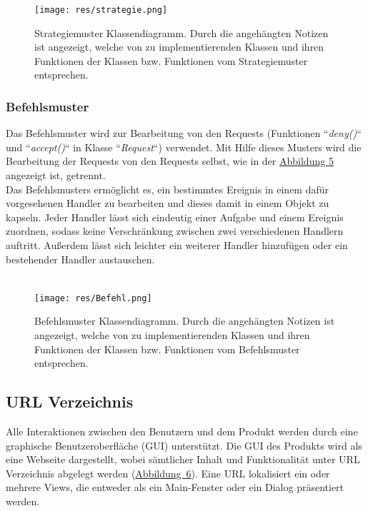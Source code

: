 \documentclass[parskip=full,11pt]{scrartcl}
\begin{document}
 \begin{figure}[ht!]
 	\centering
 	\texttt{[image: res/strategie.png]}
 	\caption{Strategiemuster Klassendiagramm. Durch die angehängten Notizen ist angezeigt, welche von zu implementierenden Klassen und ihren Funktionen der Klassen bzw. Funktionen vom Strategiemuster entsprechen. }
 \end{figure}
 
 \newpage
 \subsubsection*{Befehlsmuster}


Das Befehlsmuster wird zur Bearbeitung von den Requests (Funktionen ``\textit{deny()}`` und ``\textit{accept()}`` in Klasse ``\textit{Request}``) verwendet. Mit Hilfe dieses Musters wird die Bearbeitung der Requests von den Requests selbst, wie in der   \hyperref[Befehl]{Abbildung 5} angezeigt ist, getrennt.\\
 Das Befehlsmusters ermöglicht es, ein bestimmtes Ereignis in einem dafür vorgesehenen Handler zu bearbeiten und dieses damit in einem Objekt zu kapseln. Jeder Handler lässt sich eindeutig einer Aufgabe und einem Ereignis zuordnen, sodass keine Verschränkung zwischen zwei verschiedenen Handlern auftritt. Außerdem lässt sich leichter ein weiterer Handler hinzufügen oder ein bestehender Handler austauschen. \\\\
 
  \begin{figure}[ht!]
 	\centering
 	\texttt{[image: res/Befehl.png]}
 	\caption{Befehlsmuster Klassendiagramm. Durch die angehängten Notizen ist angezeigt, welche von zu implementierenden Klassen und ihren Funktionen der Klassen bzw. Funktionen vom Befehlsmuster entsprechen.}
 	\label{Befehl}
 \end{figure}

\newpage
  \subsection{URL Verzeichnis}
Alle Interaktionen zwischen den Benutzern und dem Produkt werden durch eine graphische Benutzeroberfläche (GUI) unterstützt. Die \gls{GUI} des Produkts wird als eine Webseite dargestellt, wobei sämtlicher Inhalt und Funktionalität unter URL Verzeichnis abgelegt werden (\hyperref[URL Struktur]{\mbox{Abbildung 6}}). Eine URL lokalisiert ein oder mehrere Views, die entweder als ein Main-Fenster oder ein Dialog präsentiert werden.  
\end{document}
